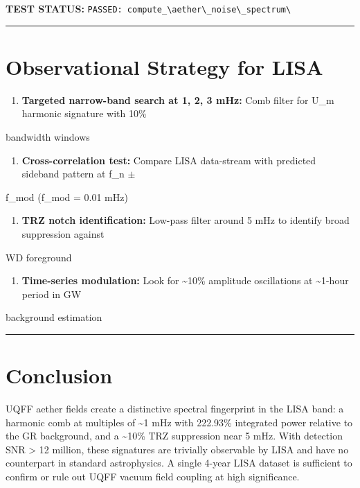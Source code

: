 \documentclass[12pt,a4paper]{article}
\begin{document}
\textbf{TEST STATUS:} \texttt{PASSED: compute\_\textbackslash {aether\textbackslash \_noise\textbackslash \_spectrum\textbackslash }}

\medskip\hrule\medskip

\section{Observational Strategy for LISA}

\begin{enumerate}
  \item \textbf{Targeted narrow-band search at 1, 2, 3 mHz:} Comb filter for U\_m harmonic signature with 10\%
\end{enumerate}

bandwidth windows

\begin{enumerate}
  \item \textbf{Cross-correlation test:} Compare LISA data-stream with predicted sideband pattern at f\_n $\pm$
\end{enumerate}

f\_mod (f\_mod = 0.01 mHz)

\begin{enumerate}
  \item \textbf{TRZ notch identification:} Low-pass filter around 5 mHz to identify broad suppression against
\end{enumerate}

WD foreground

\begin{enumerate}
  \item \textbf{Time-series modulation:} Look for \textasciitilde{}10\% amplitude oscillations at \textasciitilde{}1-hour period in GW
\end{enumerate}

background estimation

\medskip\hrule\medskip

\section{Conclusion}

UQFF aether fields create a distinctive spectral fingerprint in the LISA band: a harmonic comb at multiples of \textasciitilde{}1 mHz with 222.93\% integrated power relative to the GR background, and a \textasciitilde{}10\% TRZ suppression near 5 mHz. With detection SNR > 12 million, these signatures are trivially observable by LISA and have no counterpart in standard astrophysics. A single 4-year LISA dataset is sufficient to confirm or rule out UQFF vacuum field coupling at high significance.
\end{document}
